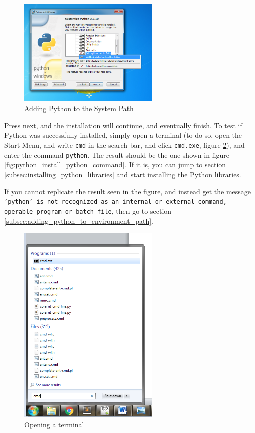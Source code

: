 \begin{figure}[h!]
  \centering
    \includegraphics[width=0.6\textwidth]{python_install_3}
    \caption{Adding Python to the System Path \label{fig:python_install_option_add_path} }
\end{figure}

Press next, and the installation will continue, and eventually finish. To test if Python was successfully installed, simply open a terminal (to do so, open the Start Menu, and write \texttt{cmd} in the search bar, and click \texttt{cmd.exe}, figure \ref{fig:python_install_open_terminal}), and enter the command \texttt{python}. The result should be the one shown in figure \ref{fig:python_install_python_command}. If it is, you can jump to section \ref{subsec:installing_python_libraries}  and start installing the Python libraries.

If you cannot replicate the result seen in the figure, and instead get the message \texttt{'python' is not recognized as an internal or external command, operable program or batch file}, then go to section \ref{subsec:adding_python_to_environment_path}.

\begin{figure}[h!]
  \centering
    \includegraphics[width=0.6\textwidth]{python_install_opening_terminal}
    \caption{Opening a terminal \label{fig:python_install_open_terminal} }
\end{figure}



